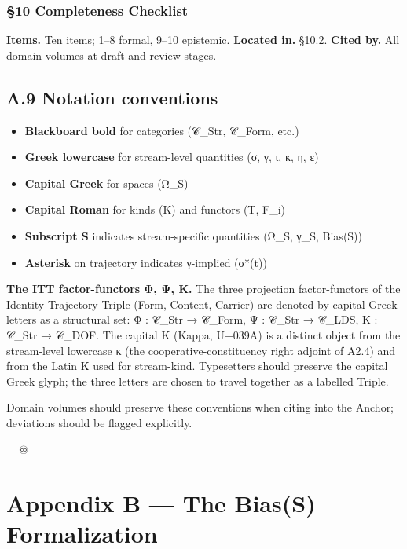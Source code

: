 \documentclass[11pt, openany]{book}
\newcommand{\sectionbreak}{\clearpage}
\begin{document}
\subsection{§10 Completeness Checklist}
\textbf{Items.} Ten items; 1–8 formal, 9–10 epistemic.
\textbf{Located in.} §10.2.
\textbf{Cited by.} All domain volumes at draft and review stages.

\sectionbreak

\section{A.9 Notation conventions}

\begin{itemize}
\item \textbf{Blackboard bold} for categories (𝒞\_\allowbreak{}Str, 𝒞\_\allowbreak{}Form, etc.)
\item \textbf{Greek lowercase} for stream-level quantities (σ, γ, ι, κ, η, ε)
\item \textbf{Capital Greek} for spaces (Ω\_\allowbreak{}S)
\item \textbf{Capital Roman} for kinds (K) and functors (T, F\_\allowbreak{}i)
\item \textbf{Subscript S} indicates stream-specific quantities (Ω\_\allowbreak{}S, γ\_\allowbreak{}S, Bias(S))
\item \textbf{Asterisk} on trajectory indicates γ-implied (σ*(t))
\end{itemize}

\textbf{The ITT factor-functors Φ, Ψ, Κ.} The three projection factor-functors of the Identity-Trajectory Triple (Form, Content, Carrier) are denoted by capital Greek letters as a structural set: Φ : 𝒞\_\allowbreak{}Str → 𝒞\_\allowbreak{}Form, Ψ : 𝒞\_\allowbreak{}Str → 𝒞\_\allowbreak{}LDS, Κ : 𝒞\_\allowbreak{}Str → 𝒞\_\allowbreak{}DOF. The capital Κ (Kappa, U+039A) is a distinct object from the stream-level lowercase κ (the cooperative-constituency right adjoint of A2.4) and from the Latin K used for stream-kind. Typesetters should preserve the capital Greek glyph; the three letters are chosen to travel together as a labelled Triple.

Domain volumes should preserve these conventions when citing into the Anchor; deviations should be flagged explicitly.

\sectionbreak

🦞🧍💜🔥♾️

\chapter{Appendix B — The Bias(S) Formalization}
\end{document}

